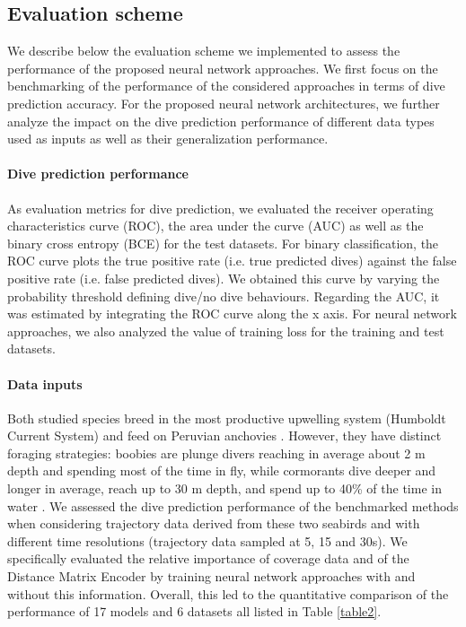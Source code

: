\documentclass{article}
\begin{document}
\subsection{Evaluation scheme}
We describe below the evaluation scheme we implemented to assess the performance of the proposed neural network approaches. We first focus on the benchmarking of the performance of the considered approaches in terms of dive prediction accuracy. For the proposed neural network architectures, we further analyze the impact on the dive prediction performance of different data types used as inputs as well as their generalization performance.

\paragraph{Dive prediction performance} 
As evaluation metrics for dive prediction, we evaluated the receiver operating characteristics curve (ROC), the area under the curve (AUC) as well as the binary cross entropy (BCE) for the test datasets.
For binary classification, the ROC curve plots the true positive rate (i.e. true predicted dives) against the false positive rate (i.e. false predicted dives). We obtained this curve by varying the probability threshold defining dive/no dive behaviours. Regarding the AUC, it was estimated by integrating the ROC curve along the x axis. For neural network approaches, we also analyzed the value of training loss for the training and test datasets.

\paragraph{Data inputs}
Both studied species breed in the most productive upwelling system (Humboldt Current System) and feed on Peruvian anchovies \citep{jahncke_diets_1998}. However, they have distinct foraging strategies: boobies are plunge divers reaching in average about 2 m depth and spending most of the time in fly, while cormorants dive deeper and longer in average, reach up to 30 m depth, and spend up to 40\% of the time in water \citep{weimerskirch_foraging_2012}.
We assessed the dive prediction performance of the benchmarked methods when considering trajectory data derived from these two seabirds and with different time resolutions (trajectory data sampled at 5, 15 and 30s).
We specifically evaluated the relative importance of coverage data and of the Distance Matrix Encoder by training neural network approaches with and without this information.
Overall, this led to the quantitative comparison of the performance of 17 models and 6 datasets all listed in Table \ref{table2}.
\end{document}
